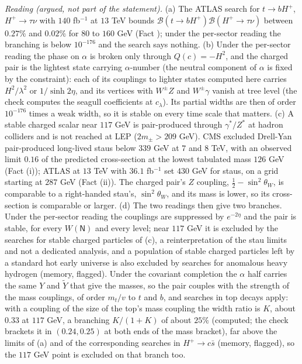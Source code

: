 \emph{Reading (argued, not part of the statement).} (a) The ATLAS search for $t \to bH^{+}$, $H^{+} \to \tau\nu$ with $140$ fb$^{-1}$ at $13$ TeV bounds $\mathcal{B}(t \to bH^{+})\mathcal{B}(H^{+} \to \tau\nu)$ between $0.27\%$ and $0.02\%$ for $80$ to $160$ GeV (Fact ); under the per-sector reading the branching is below $10^{-176}$ and the search says nothing. (b) Under the per-sector reading the phase on $\alpha$ is broken only through $Q(c) = -H^{2}$, and the charged pair is the lightest state carrying $\alpha$-number (the neutral component of $\alpha$ is fixed by the constraint): each of its couplings to lighter states computed here carries $H^{2}/\lambda^{2}$ or $1/\sinh 2\eta$, and its vertices with $W^{\pm}Z$ and $W^{\pm}\gamma$ vanish at tree level (the check computes the seagull coefficients at $c_{\lambda}$). Its partial widths are then of order $10^{-176}$ times a weak width, so it is stable on every time scale that matters. (c) A stable charged scalar near $117$ GeV is pair-produced through $\gamma^{*}/Z^{*}$ at hadron colliders and is not reached at LEP ($2m_{\pm} > 209$ GeV). CMS excluded Drell-Yan pair-produced long-lived staus below $339$ GeV at $7$ and $8$ TeV, with an observed limit $0.16$ of the predicted cross-section at the lowest tabulated mass $126$ GeV (Fact (i)); ATLAS at $13$ TeV with $36.1$ fb$^{-1}$ set $430$ GeV for staus, on a grid starting at $287$ GeV (Fact (ii)). The charged pair's $Z$ coupling, $\tfrac12 - \sin^{2}\theta_{W}$, is comparable to a right-handed stau's, $\sin^{2}\theta_{W}$, and its mass is lower, so its cross-section is comparable or larger. (d) The two readings then give two branches. Under the per-sector reading the couplings are suppressed by $e^{-2\eta}$ and the pair is stable, for every $W(\mathsf{N})$ and every level; near $117$ GeV it is excluded by the searches for stable charged particles of (c), a reinterpretation of the stau limits and not a dedicated analysis, and a population of stable charged particles left by a standard hot early universe is also excluded by searches for anomalous heavy hydrogen (memory, flagged). Under the covariant completion the $\alpha$ half carries the same $Y$ and $\tilde{Y}$ that give the masses, so the pair couples with the strength of the mass couplings, of order $m_{t}/v$ to $t$ and $b$, and searches in top decays apply: with a coupling of the size of the top's mass coupling the width ratio is $K$, about $0.33$ at $117$ GeV, a branching $K/(1 + K)$ of about $25\%$ (computed; the check brackets it in $(0.24, 0.25)$ at both ends of the mass bracket), far above the limits of (a) and of the corresponding searches in $H^{+} \to c\bar{s}$ (memory, flagged), so the $117$ GeV point is excluded on that branch too.

